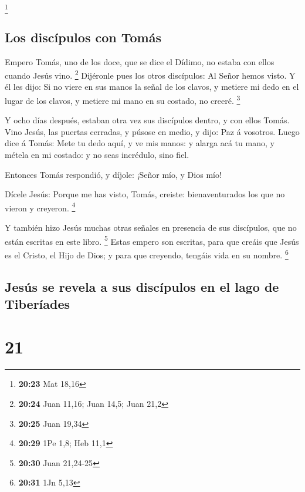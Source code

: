 \footnote{\textbf{20:23} Mat 18,16}

\hypertarget{los-discuxedpulos-con-tomuxe1s}{%
\subsection{Los discípulos con
Tomás}\label{los-discuxedpulos-con-tomuxe1s}}

 Empero Tomás, uno de los doce, que se dice el Dídimo, no
estaba con ellos cuando Jesús vino. \footnote{\textbf{20:24} Juan 11,16;
  Juan 14,5; Juan 21,2}  Dijéronle pues los otros
discípulos: Al Señor hemos visto. Y él les dijo: Si no viere en sus
manos la señal de los clavos, y metiere mi dedo en el lugar de los
clavos, y metiere mi mano en su costado, no creeré. \footnote{\textbf{20:25}
  Juan 19,34}

 Y ocho días después, estaban otra vez sus discípulos
dentro, y con ellos Tomás. Vino Jesús, las puertas cerradas, y púsose en
medio, y dijo: Paz á vosotros.  Luego dice á Tomás: Mete
tu dedo aquí, y ve mis manos: y alarga acá tu mano, y métela en mi
costado: y no seas incrédulo, sino fiel.

 Entonces Tomás respondió, y díjole: ¡Señor mío, y Dios
mío!

 Dícele Jesús: Porque me has visto, Tomás, creiste:
bienaventurados los que no vieron y creyeron. \footnote{\textbf{20:29}
  1Pe 1,8; Heb 11,1}

 Y también hizo Jesús muchas otras señales en presencia
de sus discípulos, que no están escritas en este libro. \footnote{\textbf{20:30}
  Juan 21,24-25}  Estas empero son escritas, para que
creáis que Jesús es el Cristo, el Hijo de Dios; y para que creyendo,
tengáis vida en su nombre. \footnote{\textbf{20:31} 1Jn 5,13}

\hypertarget{jesuxfas-se-revela-a-sus-discuxedpulos-en-el-lago-de-tiberuxedades}{%
\subsection{Jesús se revela a sus discípulos en el lago de
Tiberíades}\label{jesuxfas-se-revela-a-sus-discuxedpulos-en-el-lago-de-tiberuxedades}}

\hypertarget{section-20}{%
\section{21}\label{section-20}}

